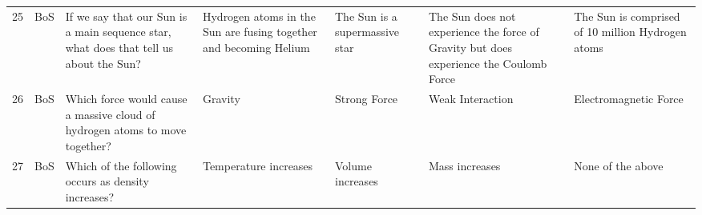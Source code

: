 \documentclass[10pt]{article}
\begin{document}
\begin{tiny}
\begin{longtable}{r P{0.3in} P{1.203in} P{0.8in} P{0.8in} P{0.8in} P{0.8in}}
    25    &     BoS &                                                                                                                                                                                            If we say that our Sun is a main sequence star, what does that tell us about the Sun? &                                                                     Hydrogen atoms in the Sun are fusing together and becoming Helium &                                                                        The Sun is a supermassive star &                                     The Sun does not experience the force of Gravity but does experience the Coulomb Force &                                                                                 The Sun is comprised of 10 million Hydrogen atoms \\
    26    &     BoS &                                                                                                                                                                                                      Which force would cause a massive cloud of hydrogen atoms to move together? &                                                                                                                               Gravity &                                                                                          Strong Force &                                                                                                           Weak Interaction &                                                                                                             Electromagnetic Force \\
    27    &     BoS &                                                                                                                                                                                                                              Which of the following occurs as density increases? &                                                                                                                 Temperature increases &                                                                                      Volume increases &                                                                                                             Mass increases &                                                                                                                 None of the above \\

\end{longtable}
\end{tiny}
\end{document}
